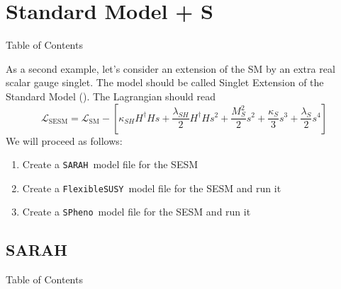 \documentclass[11pt]{beamer}
\newcommand{\FlexibleSUSY}{\texttt{FlexibleSUSY}}
\newcommand{\Lagr}{\mathcal{L}}
\newcommand{\SARAH}{\texttt{SARAH}}
\newcommand{\SESM}{\text{SESM}}
\newcommand{\SM}{\text{SM}}
\newcommand{\SPheno}{\texttt{SPheno}}
\begin{document}

\section{Standard Model + S}


\begin{frame}{Table of Contents}
  \tableofcontents[currentsection]
\end{frame}


\begin{frame}{\insertsection}
  As a second example, let's consider an extension of the SM by an
  extra real scalar gauge singlet. The model should be called Singlet
  Extension of the Standard Model (\SESM).  The Lagrangian should read
  \begin{equation*}
    \Lagr_{\SESM} = \Lagr_{\SM} - \left[\kappa_{SH} H^\dagger H s + \frac{\lambda_{SH}}{2} H^\dagger H s^2 + \frac{M_S^2}{2} s^2 + \frac{\kappa_S}{3} s^3 + \frac{\lambda_S}{2} s^4\right]
  \end{equation*}
  We will proceed as follows:
  \begin{enumerate}
  \item Create a \SARAH\ model file for the SESM
  \item Create a \FlexibleSUSY\ model file for the SESM and run it
  \item Create a \SPheno\ model file for the SESM and run it
  \end{enumerate}
\end{frame}


\subsection{SARAH}


\begin{frame}{Table of Contents}
\end{frame}

\end{document}
